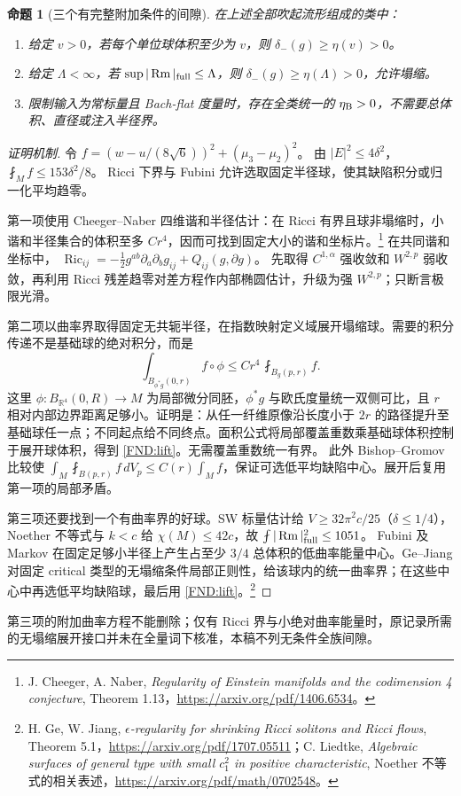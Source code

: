 \documentclass[UTF8,fontset=fandol,zihao=-4,oneside,openany]{ctexbook}
\theoremstyle{cjkplain}
\newtheorem{proposition}[theorem]{命题}
\numberwithin{equation}{chapter}
\DeclareMathOperator{\Ric}{Ric}
\DeclareMathOperator{\Rm}{Rm}
\begin{document}
\begin{proposition}[三个有完整附加条件的间隙]\label{FND:restrictedgaps}
在上述全部吹起流形组成的类中：
\begin{enumerate}
\item 给定 \(v>0\)，若每个单位球体积至少为 \(v\)，则
\(\delta_-(g)\ge\eta(v)>0\)。
\item 给定 \(\Lambda<\infty\)，若
\(\sup|\Rm|_{\rm full}\le\Lambda\)，则
\(\delta_-(g)\ge\eta(\Lambda)>0\)，允许塌缩。
\item 限制输入为常标量且 Bach-flat 度量时，存在全类统一的
\(\eta_{\rm B}>0\)，不需要总体积、直径或注入半径界。
\end{enumerate}
\end{proposition}
\begin{proof}[证明机制]
令
\(f=(w-u/(8\sqrt6))^2+(\mu_3-\mu_2)^2\)。
由 \(|E|^2\le4\delta^2\)，
\(\fint_Mf\le153\delta^2/8\)。
Ricci 下界与 Fubini 允许选取固定半径球，使其缺陷积分或归一化平均趋零。

第一项使用 Cheeger--Naber 四维谐和半径估计：在 Ricci 有界且球非塌缩时，小谐和半径集合的体积至多 \(Cr^4\)，因而可找到固定大小的谐和坐标片。\footnote{J. Cheeger, A. Naber, \emph{Regularity of Einstein manifolds and the codimension 4 conjecture}, Theorem 1.13，\url{https://arxiv.org/pdf/1406.6534}。}
在共同谐和坐标中，
\(\Ric_{ij}=-\frac12g^{ab}\partial_a\partial_bg_{ij}+Q_{ij}(g,\partial g)\)。
先取得 \(C^{1,\alpha}\) 强收敛和 \(W^{2,p}\) 弱收敛，再利用 Ricci 残差趋零对差方程作内部椭圆估计，升级为强 \(W^{2,p}\)；只断言极限光滑。

第二项以曲率界取得固定无共轭半径，在指数映射定义域展开塌缩球。需要的积分传递不是基础球的绝对积分，而是
\begin{equation}\label{FND:lift}
\int_{B_{\phi^*g}(0,r)}f\circ\phi
\le Cr^4\,\fint_{B_g(p,r)}f .
\end{equation}
这里 \(\phi:B_{\mathbb R^4}(0,R)\to M\) 为局部微分同胚，\(\phi^*g\) 与欧氏度量统一双侧可比，且 \(r\) 相对内部边界距离足够小。证明是：从任一纤维原像沿长度小于 \(2r\) 的路径提升至基础球任一点；不同起点给不同终点。面积公式将局部覆盖重数乘基础球体积控制于展开球体积，得到 \eqref{FND:lift}。无需覆盖重数统一有界。
此外 Bishop--Gromov 比较使
\(\int_M\fint_{B(p,r)}f\,dV_p\le C(r)\int_Mf\)，保证可选低平均缺陷中心。展开后复用第一项的局部矛盾。

第三项还要找到一个有曲率界的好球。SW 标量估计给
\(V\ge32\pi^2c/25\)（\(\delta\le1/4\)），Noether 不等式与
\(k<c\) 给 \(\chi(M)\le42c\)，故
\(\fint|\Rm|_{\rm full}^2\le1051\)。
Fubini 及 Markov 在固定足够小半径上产生占至少 \(3/4\) 总体积的低曲率能量中心。Ge--Jiang 对固定 critical 类型的无塌缩条件局部正则性，给该球内的统一曲率界；在这些中心中再选低平均缺陷球，最后用 \eqref{FND:lift}。\footnote{H. Ge, W. Jiang, \emph{\(\epsilon\)-regularity for shrinking Ricci solitons and Ricci flows}, Theorem 5.1，\url{https://arxiv.org/pdf/1707.05511}；C. Liedtke, \emph{Algebraic surfaces of general type with small \(c_1^2\) in positive characteristic}, Noether 不等式的相关表述，\url{https://arxiv.org/pdf/math/0702548}。}
\end{proof}
第三项的附加曲率方程不能删除；仅有 Ricci 界与小绝对曲率能量时，原记录所需的无塌缩展开接口并未在全量词下核准，本稿不列无条件全族间隙。
\end{document}
